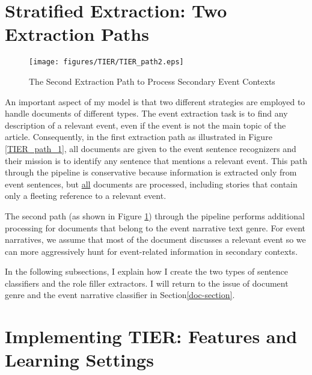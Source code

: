 \section{Stratified Extraction: Two Extraction Paths}
\label{stratified}

\begin{figure}[h]
 \centering
 \texttt{[image: figures/TIER/TIER\_path2.eps]}
 \caption{The Second Extraction Path to Process Secondary Event Contexts}
\label{TIER_path_2}
\end{figure} 

An important aspect of my model is that two different strategies are
employed to handle documents of different types.  The event extraction
task is to find any description of a relevant event, even if the event
is not the main topic of the article. 
Consequently, in the first extraction path as illustrated 
in Figure \ref{TIER_path_1}, all documents are
given to the event sentence recognizers and their mission is to
identify any sentence that mentions a relevant event. This path
through the pipeline is conservative because  information is extracted
only from event sentences, but 
\underline{all} documents are processed, including stories that contain only a fleeting
reference to a relevant event.

The second path (as shown in Figure \ref{TIER_path_2}) through the pipeline performs additional processing
for documents that belong to the event narrative text genre.  For
event narratives, we assume that most of the document discusses a
relevant event so we can more aggressively hunt for event-related
information in secondary contexts. 

In the following subsections, I explain how I create the two types of sentence
classifiers and the role filler extractors. I will return to the
issue of document genre and the event narrative classifier
in Section\ref{doc-section}.

\section{Implementing TIER: Features and Learning Settings}
\label{details}

